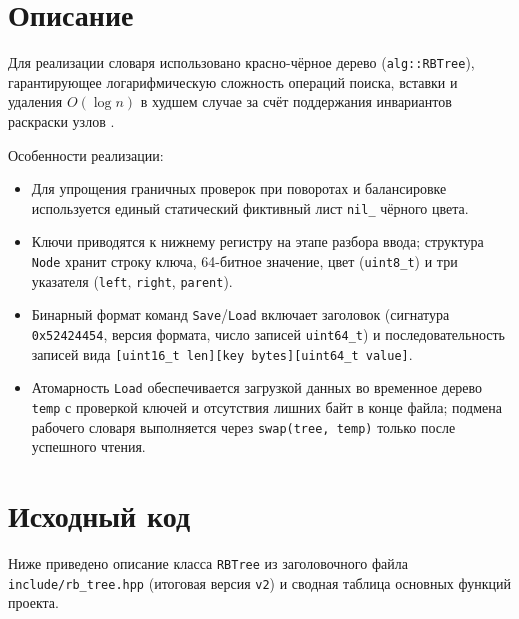 \section{Описание}
Для реализации словаря использовано красно-чёрное дерево (\texttt{alg::RBTree}), гарантирующее логарифмическую сложность операций поиска, вставки и удаления $O(\log n)$ в худшем случае за счёт поддержания инвариантов раскраски узлов \cite{Kormen}.

Особенности реализации:
\begin{itemize}
    \item Для упрощения граничных проверок при поворотах и балансировке используется единый статический фиктивный лист \texttt{nil\_} чёрного цвета.
    \item Ключи приводятся к нижнему регистру на этапе разбора ввода; структура \texttt{Node} хранит строку ключа, 64-битное значение, цвет (\texttt{uint8\_t}) и три указателя (\texttt{left}, \texttt{right}, \texttt{parent}).
    \item Бинарный формат команд \texttt{Save}/\texttt{Load} включает заголовок (сигнатура \texttt{0x52424454}, версия формата, число записей \texttt{uint64\_t}) и последовательность записей вида \texttt{[uint16\_t len][key bytes][uint64\_t value]}.
    \item Атомарность \texttt{Load} обеспечивается загрузкой данных во временное дерево \texttt{temp} с проверкой ключей и отсутствия лишних байт в конце файла; подмена рабочего словаря выполняется через \texttt{swap(tree, temp)} только после успешного чтения.
\end{itemize}

\section{Исходный код}
Ниже приведено описание класса \texttt{RBTree} из заголовочного файла \texttt{include/rb\_tree.hpp} (итоговая версия \texttt{v2}) и сводная таблица основных функций проекта.

